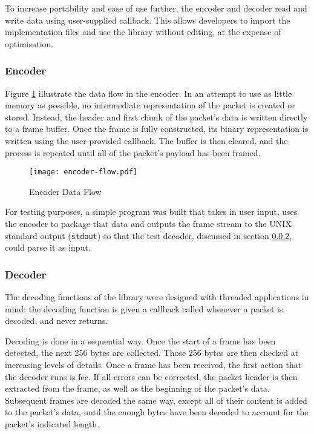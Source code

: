 To increase portability and ease of use further, the encoder and decoder read
and write data using user-supplied callback. This allows developers to import
the implementation files and use the library without editing, at the expense of
optimisation.

\subsubsection{Encoder}

Figure \ref{fig:encoder-flow} illustrate the data flow in the encoder.
In an attempt to use as little memory as possible, no intermediate
representation of the packet is created or stored. Instead, the header and
first chunk of the packet's data is written directly to a frame buffer. Once
the frame is fully constructed, its binary representation is written using the
user-provided callback. The buffer is then cleared, and the process is repeated
until all of the packet's payload has been framed. 

\begin{figure}[H]
\texttt{[image: encoder-flow.pdf]}
\centering
\caption{Encoder Data Flow}
\label{fig:encoder-flow}
\end{figure}

For testing purposes, a simple program was built that takes in user input,
uses the encoder to package that data and outputs the frame stream to the
UNIX standard output (\texttt{stdout}) so that the test decoder, discussed in
section \ref{sssec:rtx-decoder}, could parse it as input.


\subsubsection{Decoder}
\label{sssec:rtx-decoder}

The decoding functions of the library were designed with threaded applications
in mind: the decoding function is given a callback called whenever a packet
is decoded, and never returns.

Decoding is done in a sequential way. Once the start of a frame has been
detected, the next 256 bytes are collected. Those 256 bytes are then checked
at increasing levels of details. Once a frame has been received, the first
action that the decoder runs is \acrlong{fec}. If all errors can be corrected,
the packet header is then extracted from the frame, as well as the beginning of
the packet's data. Subsequent frames are decoded the same way, except all of
their content is added to the packet's data, until the enough bytes have been
decoded to account for the packet's indicated length.

